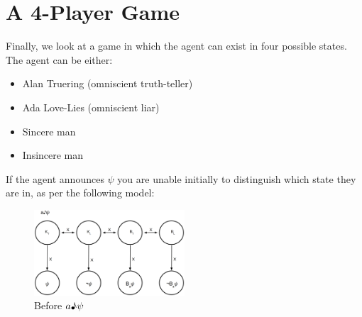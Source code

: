 \documentclass[12pt, titlepage, twoside, a4paper]{report}
\begin{document}
\section{A 4-Player Game}
Finally, we look at a game in which the agent can exist in four possible states. The agent can be either:
\begin{itemize}
\item Alan Truering (omniscient truth-teller)
\item Ada Love-Lies (omniscient liar)
\item Sincere man
\item Insincere man
\end{itemize}
If the agent announces $\psi$ you are unable initially to distinguish which state they are in, as per the following model:
\begin{figure}[h!]
  \centering
  \includegraphics[width=0.5\textwidth]{slide40.eps}
  \caption{Before $a \text{\textmusicalnote} \psi$}
\end{figure}
\end{document}
